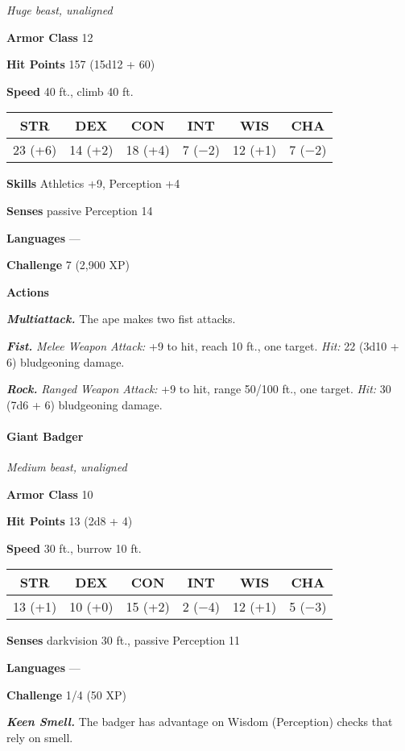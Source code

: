 \documentclass[
]{article}
\begin{document}
\emph{Huge beast, unaligned}

\textbf{Armor Class} 12

\textbf{Hit Points} 157 (15d12 + 60)

\textbf{Speed} 40 ft., climb 40 ft.

\begin{longtable}[]{@{}cccccc@{}}
\toprule
STR & DEX & CON & INT & WIS & CHA\tabularnewline
\midrule
\endhead
23 (+6) & 14 (+2) & 18 (+4) & 7 (−2) & 12 (+1) & 7 (−2)\tabularnewline
\bottomrule
\end{longtable}

\textbf{Skills} Athletics +9, Perception +4

\textbf{Senses} passive Perception 14

\textbf{Languages} ---

\textbf{Challenge} 7 (2,900 XP)

\textbf{Actions}

\emph{\textbf{Multiattack.}} The ape makes two fist attacks.

\emph{\textbf{Fist.}} \emph{Melee Weapon Attack:} +9 to hit, reach 10
ft., one target. \emph{Hit:} 22 (3d10 + 6) bludgeoning damage.

\emph{\textbf{Rock.}} \emph{Ranged Weapon Attack:} +9 to hit, range
50/100 ft., one target. \emph{Hit:} 30 (7d6 + 6) bludgeoning damage.

\hypertarget{giant-badger}{%
\paragraph{Giant Badger}\label{giant-badger}}

\emph{Medium beast, unaligned}

\textbf{Armor Class} 10

\textbf{Hit Points} 13 (2d8 + 4)

\textbf{Speed} 30 ft., burrow 10 ft.

\begin{longtable}[]{@{}cccccc@{}}
\toprule
STR & DEX & CON & INT & WIS & CHA\tabularnewline
\midrule
\endhead
13 (+1) & 10 (+0) & 15 (+2) & 2 (−4) & 12 (+1) & 5 (−3)\tabularnewline
\bottomrule
\end{longtable}

\textbf{Senses} darkvision 30 ft., passive Perception 11

\textbf{Languages} ---

\textbf{Challenge} 1/4 (50 XP)

\emph{\textbf{Keen Smell.}} The badger has advantage on Wisdom
(Perception) checks that rely on smell.
\end{document}
